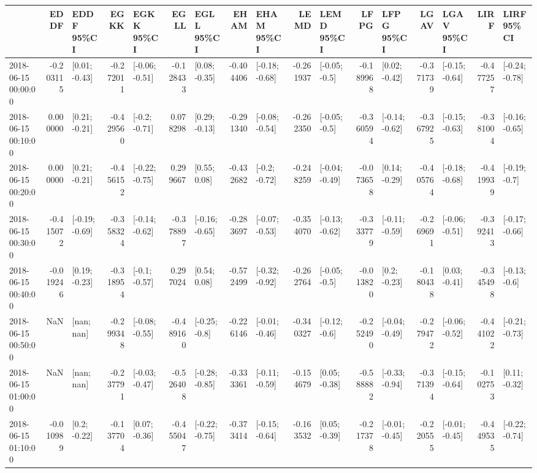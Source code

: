 \begin{tabular}{lrlrlrlrlrlrlrlrl}
\toprule
{} &      EDDF &      EDDF 95\%CI &      EGKK &      EGKK 95\%CI &      EGLL &      EGLL 95\%CI &      EHAM &      EHAM 95\%CI &      LEMD &      LEMD 95\%CI &      LFPG &      LFPG 95\%CI &      LGAV &      LGAV 95\%CI &      LIRF &      LIRF 95\%CI \\
\midrule
2018-06-15 00:00:00 & -0.203115 &   [0.01; -0.43] & -0.272011 &  [-0.06; -0.51] & -0.128433 &   [0.08; -0.35] & -0.404406 &  [-0.18; -0.68] & -0.261937 &   [-0.05; -0.5] & -0.189968 &   [0.02; -0.42] & -0.371739 &  [-0.15; -0.64] & -0.477257 &  [-0.24; -0.78] \\
2018-06-15 00:10:00 &  0.000000 &   [0.21; -0.21] & -0.429560 &   [-0.2; -0.71] &  0.078298 &   [0.29; -0.13] & -0.291340 &  [-0.08; -0.54] & -0.262350 &   [-0.05; -0.5] & -0.360594 &  [-0.14; -0.62] & -0.367925 &  [-0.15; -0.63] & -0.381004 &  [-0.16; -0.65] \\
2018-06-15 00:20:00 &  0.000000 &   [0.21; -0.21] & -0.456152 &  [-0.22; -0.75] &  0.299667 &    [0.55; 0.08] & -0.432682 &   [-0.2; -0.72] & -0.248259 &  [-0.04; -0.49] & -0.073658 &   [0.14; -0.29] & -0.405764 &  [-0.18; -0.68] & -0.419939 &   [-0.19; -0.7] \\
2018-06-15 00:30:00 & -0.415072 &  [-0.19; -0.69] & -0.358324 &  [-0.14; -0.62] & -0.378897 &  [-0.16; -0.65] & -0.283697 &  [-0.07; -0.53] & -0.354070 &  [-0.13; -0.62] & -0.333779 &  [-0.11; -0.59] & -0.269691 &  [-0.06; -0.51] & -0.392413 &  [-0.17; -0.66] \\
2018-06-15 00:40:00 & -0.019246 &   [0.19; -0.23] & -0.318954 &   [-0.1; -0.57] &  0.297024 &    [0.54; 0.08] & -0.572499 &  [-0.32; -0.92] & -0.262764 &   [-0.05; -0.5] & -0.013820 &    [0.2; -0.23] & -0.180438 &   [0.03; -0.41] & -0.345498 &   [-0.13; -0.6] \\
2018-06-15 00:50:00 &       NaN &      [nan; nan] & -0.299348 &  [-0.08; -0.55] & -0.489160 &   [-0.25; -0.8] & -0.226146 &  [-0.01; -0.46] & -0.340327 &   [-0.12; -0.6] & -0.252490 &  [-0.04; -0.49] & -0.279472 &  [-0.06; -0.52] & -0.441022 &  [-0.21; -0.73] \\
2018-06-15 01:00:00 &       NaN &      [nan; nan] & -0.237791 &  [-0.03; -0.47] & -0.526408 &  [-0.28; -0.85] & -0.333361 &  [-0.11; -0.59] & -0.154679 &   [0.05; -0.38] & -0.588882 &  [-0.33; -0.94] & -0.371394 &  [-0.15; -0.64] & -0.102753 &   [0.11; -0.32] \\
2018-06-15 01:10:00 & -0.010989 &    [0.2; -0.22] & -0.137704 &   [0.07; -0.36] & -0.455047 &  [-0.22; -0.75] & -0.373414 &  [-0.15; -0.64] & -0.163532 &   [0.05; -0.39] & -0.217378 &  [-0.01; -0.45] & -0.220555 &  [-0.01; -0.45] & -0.449535 &  [-0.22; -0.74] \\

\end{tabular}
